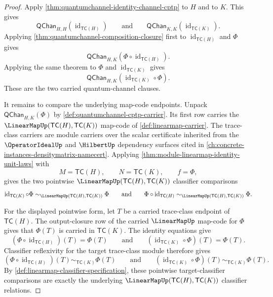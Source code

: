 \begin{proof}
Apply \autoref{thm:quantumchannel-identity-channel-cptp} to $H$ and to $K$. This gives
$$
\mathsf{QChan}_{H,H}(\operatorname{id}_{\mathsf{TC}(H)})
\qquad\text{and}\qquad
\mathsf{QChan}_{K,K}(\operatorname{id}_{\mathsf{TC}(K)}).
$$
Applying \autoref{thm:quantumchannel-composition-closure} first to $\operatorname{id}_{\mathsf{TC}(H)}$ and $\Phi$ gives
$$
\mathsf{QChan}_{H,K}(\Phi\circ\operatorname{id}_{\mathsf{TC}(H)}).
$$
Applying the same theorem to $\Phi$ and $\operatorname{id}_{\mathsf{TC}(K)}$ gives
$$
\mathsf{QChan}_{H,K}(\operatorname{id}_{\mathsf{TC}(K)}\circ\Phi).
$$
These are the two carried quantum-channel clauses.

It remains to compare the underlying map-code endpoints. Unpack $\mathsf{QChan}_{H,K}(\Phi)$ by \autoref{def:quantumchannel-cptp-carrier}. Its first row carries the $\LinearMapUp(\mathsf{TC}(H),\mathsf{TC}(K))$ map-code of \autoref{def:linearmap-carrier}. The trace-class carriers are module carriers over the scalar certificate inherited from the $\OperatorIdealUp$ and $\HilbertUp$ dependency surfaces cited in \autoref{ch:concrete-instances-densitymatrix-namecert}. Applying \autoref{thm:module-linearmap-identity-unit-laws} with
$$
M=\mathsf{TC}(H),
\qquad
N=\mathsf{TC}(K),
\qquad
f=\Phi,
$$
gives the two pointwise $\LinearMapUp(\mathsf{TC}(H),\mathsf{TC}(K))$ classifier comparisons
$$
\operatorname{id}_{\mathsf{TC}(K)}\circ\Phi
\sim_{\LinearMapUp(\mathsf{TC}(H),\mathsf{TC}(K))}
\Phi
\qquad\text{and}\qquad
\Phi\circ\operatorname{id}_{\mathsf{TC}(H)}
\sim_{\LinearMapUp(\mathsf{TC}(H),\mathsf{TC}(K))}
\Phi.
$$

For the displayed pointwise form, let $T$ be a carried trace-class endpoint of $\mathsf{TC}(H)$. The output-closure row of the carried $\LinearMapUp$ map-code for $\Phi$ gives that $\Phi(T)$ is carried in $\mathsf{TC}(K)$. The identity equations give
$$
(\Phi\circ\operatorname{id}_{\mathsf{TC}(H)})(T)=\Phi(T)
\qquad\text{and}\qquad
(\operatorname{id}_{\mathsf{TC}(K)}\circ\Phi)(T)=\Phi(T).
$$
Classifier reflexivity for the target trace-class module therefore gives
$$
(\Phi\circ\operatorname{id}_{\mathsf{TC}(H)})(T)
\sim_{\mathsf{TC}(K)}
\Phi(T)
\qquad\text{and}\qquad
(\operatorname{id}_{\mathsf{TC}(K)}\circ\Phi)(T)
\sim_{\mathsf{TC}(K)}
\Phi(T).
$$
By \autoref{def:linearmap-classifier-specification}, these pointwise target-classifier comparisons are exactly the underlying $\LinearMapUp(\mathsf{TC}(H),\mathsf{TC}(K))$ classifier relations.
\end{proof}

